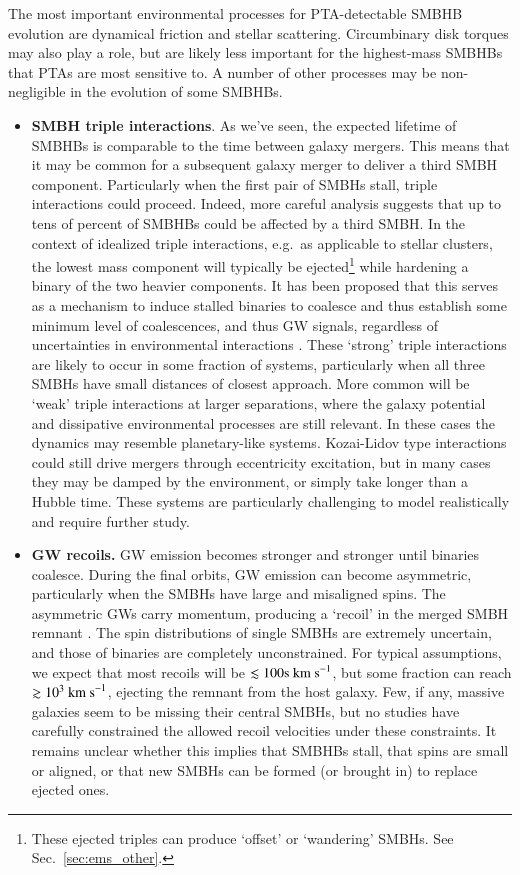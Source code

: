 \documentclass[onecolumn,authoryear]{els-mrw}
\begin{document}
The most important environmental processes for PTA-detectable SMBHB evolution are dynamical friction and stellar scattering.  Circumbinary disk torques may also play a role, but are likely less important for the highest-mass SMBHBs that PTAs are most sensitive to.  A number of other processes may be non-negligible in the evolution of some SMBHBs.
\begin{itemize}
    \item \textbf{SMBH triple interactions}.  As we've seen, the expected lifetime of SMBHBs is comparable to the time between galaxy mergers.  This means that it may be common for a subsequent galaxy merger to deliver a third SMBH component.  Particularly when the first pair of SMBHs stall, triple interactions could proceed.  Indeed, more careful analysis suggests that up to tens of percent of SMBHBs could be affected by a third SMBH.  In the context of idealized triple interactions, e.g.~as applicable to stellar clusters, the lowest mass component will typically be ejected\footnote{These ejected triples can produce `offset' or `wandering' SMBHs.  See Sec.~\ref{sec:ems_other}.} while hardening a binary of the two heavier components.  It has been proposed that this serves as a mechanism to induce stalled binaries to coalesce and thus establish some minimum level of coalescences, and thus GW signals, regardless of uncertainties in environmental interactions \citep{Ryu+2018, Bonetti+2018}.  These `strong' triple interactions are likely to occur in some fraction of systems, particularly when all three SMBHs have small distances of closest approach.  More common will be `weak' triple interactions at larger separations, where the galaxy potential and dissipative environmental processes are still relevant.  In these cases the dynamics may resemble planetary-like systems.  Kozai-Lidov type interactions could still drive mergers through eccentricity excitation, but in many cases they may be damped by the environment, or simply take longer than a Hubble time.  These systems are particularly challenging to model realistically and require further study.
    \item \textbf{GW recoils.}  GW emission becomes stronger and stronger until binaries coalesce.  During the final orbits, GW emission can become asymmetric, particularly when the SMBHs have large and misaligned spins.  The asymmetric GWs carry momentum, producing a `recoil' in the merged SMBH remnant \citep{Blecha+2016}.  The spin distributions of single SMBHs are extremely uncertain, and those of binaries are completely unconstrained.  For typical assumptions, we expect that most recoils will be $\lesssim 100\tr{s}~\rm{km\ s}^{-1}$, but some fraction can reach $\gtrsim 10^3~\rm{km\ s}^{-1}$, ejecting the remnant from the host galaxy.  Few, if any, massive galaxies seem to be missing their central SMBHs, but no studies have carefully constrained the allowed recoil velocities under these constraints.  It remains unclear whether this implies that SMBHBs stall, that spins are small or aligned, or that new SMBHs can be formed (or brought in) to replace ejected ones.

\end{itemize}
\end{document}

